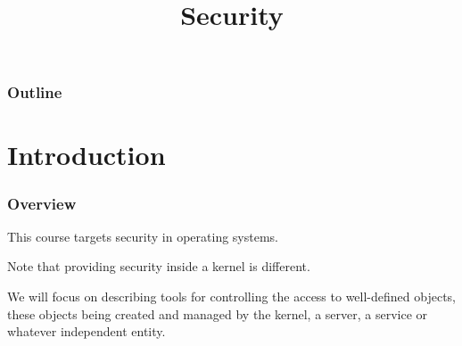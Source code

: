 %
%
%
%
%
%

%
%

%
%

\def\path{../../../..}

%
%



%
%

\title{Security}

%
%



%
%

\begin{frame}
  \titlepage
\end{frame}

%
%

\begin{frame}
  \frametitle{Outline}

  \tableofcontents
\end{frame}

%
%

%
%

\section{Introduction}


\begin{frame}
  \frametitle{Overview}

  This course targets security in operating systems.

  \-

  Note that providing security inside a kernel is different.

  \-

  We will focus on describing tools for controlling the access to well-defined
  objects, these objects being created and managed by the kernel, a server,
  a service or whatever independent entity.
\end{frame}

